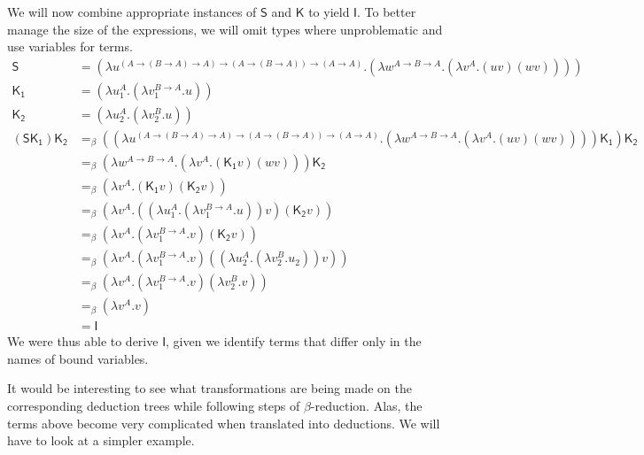 We will now combine appropriate instances of $\mathsf{S}$ and $\mathsf{K}$ to
yield $\mathsf{I}$. To better manage the size of the expressions, we will omit
types where unproblematic and use variables for terms.
\begin{align*}
\mathsf{S} &=
(\lambda u^{(A \to (B \to A) \to A) \to (A \to (B \to A)) \to (A \to A)}.
  (\lambda w^{A \to B \to A}.
    (\lambda v^A.(uv)(wv))
  )
) \\
\mathsf{K_1} &=
(\lambda u_1^A.
  (\lambda v_1^{B \to A}.u)
) \\
\mathsf{K_2} &=
(\lambda u_2^A.
  (\lambda v_2^B.u)
) \\
\mathsf{(SK_1)K_2} &=_\beta
(
  (\lambda u^{(A \to (B \to A) \to A) \to (A \to (B \to A)) \to (A \to A)}.
    (\lambda w^{A \to B \to A}.
      (\lambda v^A.(uv)(wv))
    )
  )
  \mathsf{K_1}
)
\mathsf{K_2} \\
&=_\beta
(\lambda w^{A \to B \to A}.
  (\lambda v^A.(\mathsf{K_1}v)(wv))
)
\mathsf{K_2} \\
&=_\beta
(\lambda v^A.(\mathsf{K_1}v)(\mathsf{K_2}v)) \\
&=_\beta
(\lambda v^A.
  ((\lambda u_1^A.
    (\lambda v_1^{B \to A}.u)
  )v)
  (\mathsf{K_2}v)
) \\
&=_\beta
(\lambda v^A.
  (\lambda v_1^{B \to A}.v)
  (\mathsf{K_2}v)
) \\
&=_\beta
(\lambda v^A.
  (\lambda v_1^{B \to A}.v)
  ((\lambda u_2^A.
     (\lambda v_2^B.u_2)
  )v)
) \\
&=_\beta
(\lambda v^A.
  (\lambda v_1^{B \to A}.v)
  (\lambda v_2^B.v)
) \\
&=_\beta
(\lambda v^A.v) \\
&=
\mathsf{I}
\end{align*}
We were thus able to derive $\mathsf{I}$, given we identify terms that differ only in
the names of bound variables.

It would be interesting to see what transformations are being made on the
corresponding deduction trees while following steps of $\beta$-reduction.  Alas,
the terms above become very complicated when translated into deductions. We will
have to look at a simpler example.
